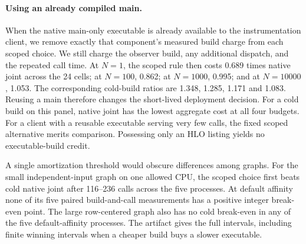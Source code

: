 \paragraph{Using an already compiled main.}
When the native main-only executable is already available to the instrumentation client, we remove exactly that component's measured build charge from each scoped choice. We still charge the observer build, any additional dispatch, and the repeated call time. At $N=1$, the scoped rule then costs 0.689 times native joint across the 24 cells; at $N=100$, 0.862; at $N=1000$, 0.995; and at $N=10000$, 1.053. The corresponding cold-build ratios are 1.348, 1.285, 1.171 and 1.083. Reusing a main therefore changes the short-lived deployment decision. For a cold build on this panel, native joint has the lowest aggregate cost at all four budgets. For a client with a reusable executable serving very few calls, the fixed scoped alternative merits comparison. Possessing only an HLO listing yields no executable-build credit.

A single amortization threshold would obscure differences among graphs. For the small independent-input graph on one allowed CPU, the scoped choice first beats cold native joint after 116--236 calls across the five processes. At default affinity none of its five paired build-and-call measurements has a positive integer break-even point. The large row-centered graph also has no cold break-even in any of the five default-affinity processes. The artifact gives the full intervals, including finite winning intervals when a cheaper build buys a slower executable.
